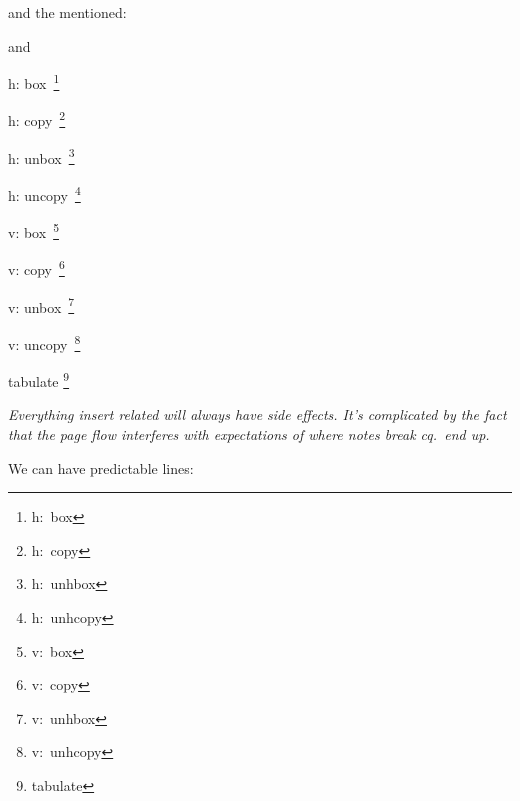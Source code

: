 and the mentioned:

\startnarrower \type {\orelse} and \type {\orunless} \stopnarrower

\stoptitle

\starttitle[title=Migration]

\startbuffer
h: \hbox{box    \footnote{h:     box}}\hbox{}\par
h: \hbox{copy   \footnote{h:    copy}}\hbox{}\par
h: \hbox{unbox  \footnote{h:  unhbox}}\hbox{}\par
h: \hbox{uncopy \footnote{h: unhcopy}}\hbox{}\par

v: \hbox{box    \footnote{v:     box}}\vbox{}\par
v: \hbox{copy   \footnote{v:    copy}}\vbox{}\par
v: \hbox{unbox  \footnote{v:  unhbox}}\vbox{}\par
v: \hbox{uncopy \footnote{v: unhcopy}}\vbox{}\par

\starttabulate[||]
\NC tabulate \footnote{tabulate} \NC \NR
\stoptabulate
\stopbuffer

\typebuffer[style={\tt\small}]

\page

\startpacked \getbuffer \stoppacked



{\em Everything insert related will always have side effects. It's complicated
by the fact that the page flow interferes with expectations of where notes
break cq.\ end up.}

\stoptitle

\starttitle[title=Normalizing lines]

We can have predictable lines:

\startbuffer
         \par
\stopbuffer

